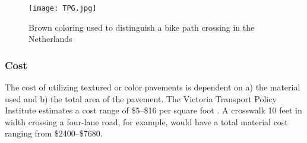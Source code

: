 \begin{figure}[h]
\centering
\texttt{[image: TPG.jpg]}
\caption[Brown coloring used to distinguish a bike path crossing in the Netherlands]{Brown coloring used to distinguish a bike path crossing in the Netherlands}\label{fig:TPG}
\end{figure}

\subsubsection{Cost}

The cost of utilizing textured or color pavements is dependent on a) the material used and b) the total area of the pavement. The Victoria Transport Policy Institute estimates a cost range of \$5--\$16 per square foot \cite{TP3}. A crosswalk 10 feet in width crossing a four-lane road, for example, would have a total material cost ranging from \$2400--\$7680.
